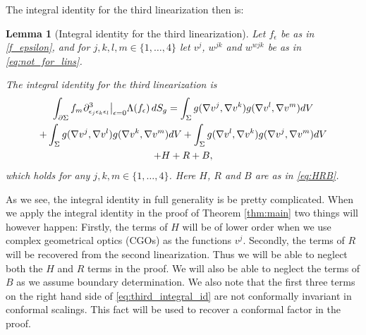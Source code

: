 \documentclass[12pt]{amsart}
\def\p{\partial}
\newtheorem{lemma}[theorem]{Lemma}
\theoremstyle{definition}
\theoremstyle{remark}
\newcommand{\eps}{\epsilon}
\newcommand{\s}{\hspace{0.5pt}}
\begin{document}
The integral identity for the third linearization then is:
\begin{lemma}[Integral identity for the third linearization]\label{Lem:Integral identity_3rd} Let $f_\eps$ be as in \eqref{f_epsilon}, and for $j,k,l,m\in \{1,\ldots,4\}$ let $v^{j}$, $w^{jk}$ and $w^{wjk}$ be as in \eqref{eq:not_for_lins}.

	The integral identity for the third linearization is
	\begin{multline}\label{eq:third_integral_id}
	 \int_{\p \Sigma} f_m \s \p^3_{\eps_j \eps_k\eps_l}\big|_{\epsilon=0} \Lambda (f_\epsilon) \, dS_g = \int_{\Sigma}g(\nabla v^{j},\nabla v^k)g(\nabla v^{l},\nabla v^m) dV  \\
	 +\int_{\Sigma}g(\nabla v^{j},\nabla v^l)g(\nabla v^{k},\nabla v^m) dV+\int_{\Sigma}g(\nabla v^{l},\nabla v^k)g(\nabla v^{j},\nabla v^m) dV \\
	 +H+R+B,
	\end{multline}
	which holds for any $j,k,m\in \{1,\ldots,4\}$. Here $H$, $R$ and $B$ are as in \eqref{eq:HRB}.
\end{lemma}
As we see, the integral identity in full generality is be pretty complicated. 
When we apply the integral identity in the proof of Theorem \ref{thm:main} two things will however happen: Firstly, the terms of $H$ will be of lower order when we use complex geometrical optics (CGOs) as the functions $v^j$. Secondly, the terms of $R$ will be recovered from the second linearization. Thus we will be able to neglect both the $H$ and $R$ terms in the proof. We will also be able to neglect the terms of $B$ as we assume boundary determination. We also note that the first three terms on the right hand side of \eqref{eq:third_integral_id} are not conformally invariant in conformal scalings. This fact will be used to recover a conformal factor in the proof.
\end{document}
